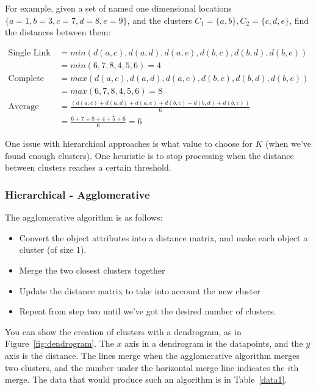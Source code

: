 For example, given a set of named one dimensional locations
$\{a=1,b=3,c=7,d=8,e=9\}$, and the clusters $C_1 = \{a,b\}, C_2 = \{c,d,e\}$,
find the distances between them:

\begin{align*}
  \text{Single Link}   &= min(d(a,c),d(a,d),d(a,e),d(b,c),d(b,d),d(b,e))\\
                       &= min(6,7,8,4,5,6) = 4\\
  \text{Complete Link} &= max(d(a,c),d(a,d),d(a,e),d(b,c),d(b,d),d(b,e))\\
                       &= max(6,7,8,4,5,6) = 8\\
  \text{Average Link}  &= \frac{(d(a,c)+d(a,d)+d(a,e)+d(b,c)+d(b,d)+d(b,e))}{6}\\
                       &= \frac{6+7+8+4+5+6}{6} = 6
\end{align*}

One issue with hierarchical approaches is what value to choose for $K$ (when
we've found enough clusters). One heuristic is to stop processing when the
distance between clusters reaches a certain threshold.

\subsubsection{Hierarchical - Agglomerative}

The agglomerative algorithm is as follows:
  
\begin{itemize}
  \item Convert the object attributes into a distance matrix, and make each
    object a cluster (of size 1).
  \item Merge the two closest clusters together
  \item Update the distance matrix to take into account the new cluster
  \item Repeat from step two until we've got the desired number of clusters.
\end{itemize}

You can show the creation of clusters with a dendrogram, as in
Figure~\ref{fig:dendrogram}. The $x$ axis in a dendrogram is the datapoints, and
the $y$ axis is the distance. The lines merge when the agglomerative algorithm
merges two clusters, and the number under the horizontal merge line indicates the
$i$th merge. The data that would produce such an algorithm is in
Table~\ref{data1}.

